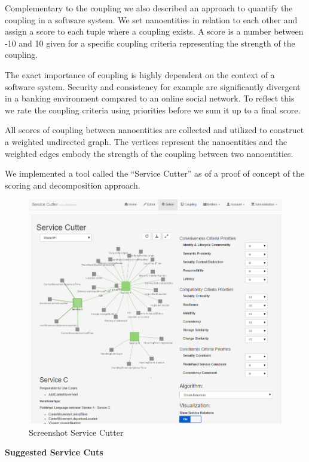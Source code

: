 Complementary to the coupling we also described an approach to quantify the coupling in a software system. We set nanoentities in relation to each other and assign a score to each tuple where a coupling exists. A score is a number between -10 and 10 given for a specific coupling criteria representing the strength of the coupling.

The exact importance of coupling is highly dependent on the context of a software system. Security and consistency for example are significantly divergent in a banking environment compared to an online social network. To reflect this we rate the coupling criteria using priorities before we sum it up to a final score.

All scores of coupling between nanoentities are collected and utilized to construct a weighted undirected graph. The vertices represent the nanoentities and the weighted edges embody the strength of the coupling between two nanoentities.

We implemented a tool called the \enquote{Service Cutter} as of a proof of concept of the scoring and decomposition approach.

\begin{figure}[H]
	\includegraphics[scale=0.65]{images/ServiceCutter.png}
	\caption{Screenshot Service Cutter}
	\label{fig:ServiceCutter-mgmt-summary}
\end{figure}

\textbf{Suggested Service Cuts}

